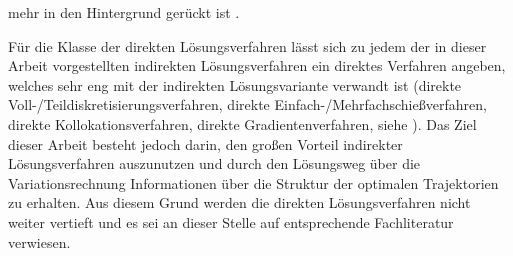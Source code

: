 mehr in den Hintergrund gerückt ist \cite{Papageorgiou.2012}. 

Für die Klasse der direkten Lösungsverfahren lässt sich zu jedem der in dieser Arbeit vorgestellten indirekten Lösungsverfahren ein direktes Verfahren angeben, welches sehr eng mit der indirekten Lösungsvariante verwandt ist (direkte Voll-/Teildiskretisierungsverfahren, direkte Einfach-/Mehrfachschießverfahren, direkte Kollokationsverfahren, direkte Gradientenverfahren, siehe \cite{KnutGraichen.2012,Gerdts.2010,Papageorgiou.2012,Ascher.1995c4,Ascher.1995c5,Betts.1998}). Das Ziel dieser Arbeit besteht jedoch darin, den großen Vorteil indirekter Lösungsverfahren auszunutzen und durch den Lösungsweg über die Variationsrechnung Informationen über die Struktur der optimalen Trajektorien zu erhalten. Aus diesem Grund werden die direkten Lösungsverfahren nicht weiter vertieft und es sei an dieser Stelle auf entsprechende Fachliteratur verwiesen.


